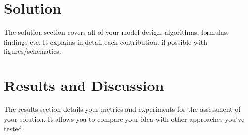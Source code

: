 \documentclass{article}
\begin{document}
\section*{Solution}

The solution section covers all of your model design, algorithms, formulas, findings etc. It explains in detail each contribution, if possible with figures/schematics.




\section*{Results and Discussion}
The results section details your metrics and experiments for the assessment of your solution. It allows you to compare your idea with other approaches you've tested. 

\nocite{*}


\end{document}
